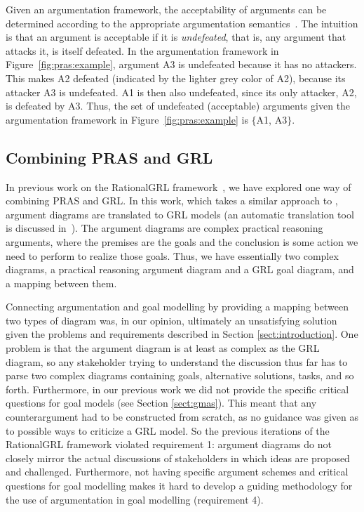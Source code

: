 Given an argumentation framework, the acceptability of arguments can be determined according to the appropriate argumentation semantics~\cite{Dung1995}. The intuition is that an argument is acceptable if it is \emph{undefeated}, that is, any argument that attacks it, is itself defeated. In the argumentation framework in Figure~\ref{fig:pras:example}, argument A3 is undefeated because it has no attackers. This makes A2 defeated (indicated by the lighter grey color of A2), because its attacker A3 is undefeated. A1 is then also undefeated, since its only attacker, A2, is defeated by A3. Thus, the set of undefeated (acceptable) arguments given the argumentation framework in Figure~\ref{fig:pras:example} is $\{$A1, A3$\}$.


\subsection{Combining PRAS and GRL}
\label{sect:background:pras:motivation}

In previous work on the RationalGRL framework~\cite{vanzee-etal:renext2015,vanZee-etal:er2016}, we have explored one way of combining PRAS and GRL. In this work, which takes a similar approach to \cite{Jureta:RE2008}, argument diagrams are translated to GRL models (an automatic translation tool is discussed in~\cite{vanZee-etal:comma2016}). The argument diagrams are complex practical reasoning arguments, where the premises are the goals and the conclusion is some action we need to perform to realize those goals. Thus, we have essentially two complex diagrams, a practical reasoning argument diagram and a GRL goal diagram, and a mapping between them. 

Connecting argumentation and goal modelling by providing a mapping between two types of diagram was, in our opinion, ultimately an unsatisfying solution given the problems and requirements described in Section \ref{sect:introduction}. One problem is that the argument diagram is at least as complex as the GRL diagram, so any stakeholder trying to understand the discussion thus far has to parse two complex diagrams containing goals, alternative solutions, tasks, and so forth. Furthermore, in our previous work we did not provide the specific critical questions for goal models (see Section \ref{sect:gmas}). This meant that any counterargument had to be constructed from scratch, as no guidance was given as to possible ways to criticize a GRL model. So the previous iterations of the RationalGRL framework violated requirement 1: argument diagrams do not closely mirror the actual discussions of stakeholders in which ideas are proposed and challenged. Furthermore, not having specific argument schemes and critical questions for goal modelling makes it hard to develop a guiding methodology for the use of argumentation in goal modelling (requirement 4). 

